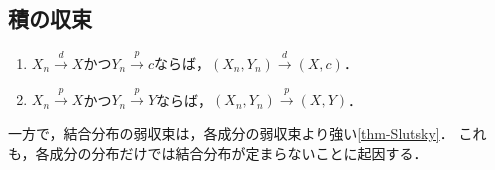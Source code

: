 \documentclass[uplatex,dvipdfmx]{jsreport}
\begin{document}
\subsection{積の収束}

\begin{theorem}\mbox{}
    \begin{enumerate}
        \item $X_n\xrightarrow{d}X$かつ$Y_n\xrightarrow{p}c$ならば，$(X_n,Y_n)\xrightarrow{d}(X,c)$．
        \item $X_n\xrightarrow{p}X$かつ$Y_n\xrightarrow{p}Y$ならば，$(X_n,Y_n)\xrightarrow{p}(X,Y)$．
    \end{enumerate}
\end{theorem}
\begin{remark}
    一方で，結合分布の弱収束は，各成分の弱収束より強い\ref{thm-Slutsky}．
    これも，各成分の分布だけでは結合分布が定まらないことに起因する．
\end{remark}
\end{document}
